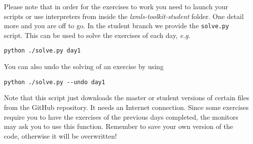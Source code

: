 Please note that in order for the exercises to work you need to launch your scripts or use interpreters from inside the  \textit{lxmls-toolkit-student} folder. One detail more and you are off to go. In the student branch we provide the \verb+solve.py+ script. This can be used to solve the exercises of each day, \emph{e.g.}

\begin{verbatim}
python ./solve.py day1
\end{verbatim}

\noindent You can also undo the solving of an exercise by using

\begin{verbatim}
python ./solve.py --undo day1
\end{verbatim}

Note that this script just downloads the master or student versions of certain files from the GitHub repository. It needs an Internet connection. Since some exercises require you to have the exercises of the previous days completed, the monitors may ask you to use this function. Remember to save your own version of the code, otherwise it will be overwritten!

